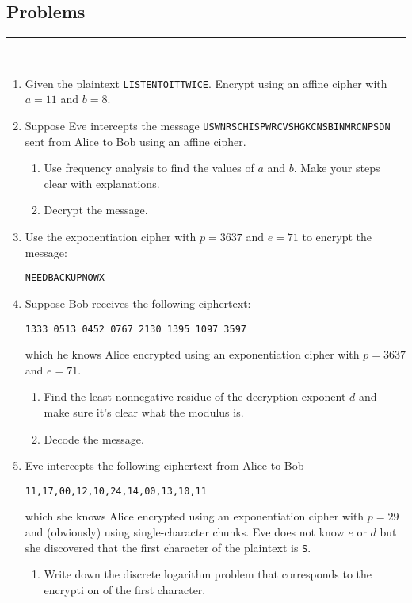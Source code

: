 \documentclass[class=article, crop=false]{standalone}
\begin{document}
\subsection{Problems}
\rule{\textwidth}{1pt}\\
\begin{enumerate}

	\item
		Given the plaintext \texttt{LISTENTOITTWICE}.
		Encrypt using an affine cipher with $a=11$ and $b=8$.
	
	\item
		Suppose Eve intercepts the message
		\texttt{USWNRSCHISPWRCVSHGKCNSBINMRCNPSDN}
		sent from Alice to Bob using an affine cipher.
		\begin{enumerate}
		\item
			Use frequency analysis to find the values of $a$ and $b$.
			Make your steps clear with explanations.
	
		\item
			Decrypt the message.
	
		\end{enumerate}
	
	\item
		Use the exponentiation cipher with $p=3637$ and $e=71$ to encrypt
		the message:
		\begin{center}
			\texttt{NEEDBACKUPNOWX}
		\end{center}
	
	\item
		Suppose Bob receives the following ciphertext:
		\begin{center}
			\texttt{1333 0513 0452 0767 2130 1395 1097 3597}
		\end{center}
		which he knows Alice encrypted using an exponentiation cipher
		with $p=3637$ and $e=71$.
	
		\begin{enumerate}
	
		\item
			Find the least nonnegative residue of the decryption exponent $d$
			and make sure it's clear what the modulus is.
	
		\item
			Decode the message.
	
		\end{enumerate}
	
	\item
		Eve intercepts the following ciphertext from Alice to Bob
		\begin{center}
			\texttt{11,17,00,12,10,24,14,00,13,10,11}
		\end{center}
		which she knows Alice encrypted using an exponentiation cipher with $p=29$
		and (obviously) using single-character chunks.
		Eve does not know $e$ or $d$ but she discovered that the first character of the
		plaintext is \texttt{S}.
		\begin{enumerate}
		\item Write down the discrete logarithm problem that corresponds to the encrypti
			on of the first character.
	

\end{enumerate}
\end{enumerate}
\end{document}
